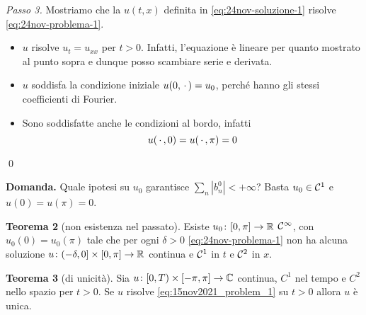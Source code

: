 \textit{Passo 3.} Mostriamo che la $u(t,x)$ definita in \eqref{eq:24nov-soluzione-1} risolve \eqref{eq:24nov-problema-1}.
\begin{itemize}

	\item $u$ risolve $u_t = u_{xx}$ per $t > 0$.
	Infatti, l'equazione è lineare per quanto mostrato al punto sopra e dunque posso scambiare serie e derivata.


	\item $u$ soddisfa la condizione iniziale $u(0,\,\cdot\,) = u_0$, perché hanno gli stessi coefficienti di Fourier.


	\item Sono soddisfatte anche le condizioni al bordo, infatti
	$$
	u(\,\cdot\,,0) = u(\,\cdot\,,\pi) = 0
	$$
\end{itemize}
\qed

\textbf{Domanda.} Quale ipotesi su $u_0$ garantisce $\sum_n |b_n^0| < +\infty$? Basta $u_0 \in \mathcal{C}^1$ e $u(0) = u(\pi) = 0$.

\textbf{Teorema 2} (non esistenza nel passato).
Esiste $u_0 \colon [0,\pi] \to \mathbb R$ $\mathcal{C}^\infty$, con $u_0(0) = u_0(\pi)$ tale che per ogni $\delta > 0$ \eqref{eq:24nov-problema-1} non ha alcuna soluzione $u \colon (-\delta,0] \times [0,\pi] \to \mathbb R$ continua e $\mathcal{C}^1$ in $t$ e $\mathcal{C}^2 $ in $x$.

\textbf{Teorema 3} (di unicità).
Sia $u \colon [0, T) \times [-\pi, \pi] \to \mathbb C$ continua, $C^1$ nel tempo e $C^2$ nello spazio per $t > 0$. Se $u$ risolve \eqref{eq:15nov2021_problem_1} su $t > 0$ allora $u$ è unica.
